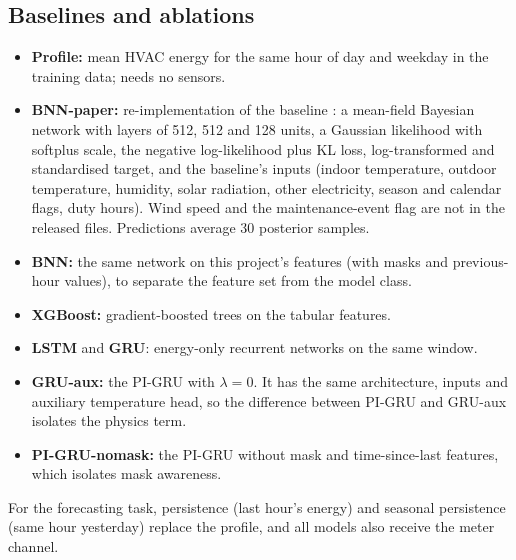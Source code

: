 \subsection{Baselines and ablations}
\begin{itemize}[nosep]
\item \textbf{Profile:} mean HVAC energy for the same hour of day and weekday in the training data; needs no sensors.
\item \textbf{BNN-paper:} re-implementation of the baseline \citep{mahajan2024bnn}: a mean-field Bayesian network \citep{blundell2015weight} with layers of 512, 512 and 128 units, a Gaussian likelihood with softplus scale, the negative log-likelihood plus KL loss, log-transformed and standardised target, and the baseline's inputs (indoor temperature, outdoor temperature, humidity, solar radiation, other electricity, season and calendar flags, duty hours). Wind speed and the maintenance-event flag are not in the released files. Predictions average 30 posterior samples.
\item \textbf{BNN:} the same network on this project's features (with masks and previous-hour values), to separate the feature set from the model class.
\item \textbf{XGBoost:} gradient-boosted trees \citep{chen2016xgboost} on the tabular features.
\item \textbf{LSTM} \citep{hochreiter1997lstm} and \textbf{GRU}: energy-only recurrent networks on the same window.
\item \textbf{GRU-aux:} the PI-GRU with $\lambda = 0$. It has the same architecture, inputs and auxiliary temperature head, so the difference between PI-GRU and GRU-aux isolates the physics term.
\item \textbf{PI-GRU-nomask:} the PI-GRU without mask and time-since-last features, which isolates mask awareness.
\end{itemize}
For the forecasting task, persistence (last hour's energy) and seasonal persistence (same hour yesterday) replace the profile, and all models also receive the meter channel.

